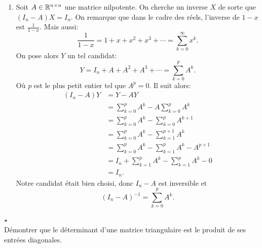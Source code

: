 {\begin{td-sol}[]
\begin{enumerate}
			\item Soit \(A\in \mathbb{R}^{n\times n}\) une matrice nilpotente. On cherche un inverse \(X\)
			de sorte que \((I_n - A)X = I_n\). On remarque que dans le cadre des réels,
			l'inverse de \(1 - x\) est \(\frac{1}{1 - x}\). Mais aussi:
			\begin{equation*}
				\frac{1}{1 - x} = 1 + x + x^2 + x^3 + \cdots = \sum_{k=0}^{\infty} x^k.
			\end{equation*}
			On pose alors \(Y\) un tel candidat:
			\begin{equation*}
				Y = I_n + A + A^2 + A^3 + \cdots = \sum_{k=0}^{p} A^k.
			\end{equation*}
			Où \(p\) est le plus petit entier tel que \(A^p = 0\). Il suit alors:
			\begin{equation*}
				\begin{aligned}
					(I_n - A)Y
					&= Y - AY\\
					&= \sum_{k=0}^{p} A^k - A \sum_{k=0}^{p} A^{k}\\
					&= \sum_{k=0}^{p} A^k - \sum_{k=0}^{p} A^{k+1}\\
					&= \sum_{k=0}^{p} A^k - \sum_{k=1}^{p+1} A^{k}\\
					&= \sum_{k=0}^{p} A^k - \sum_{k=1}^{p} A^{k} - A^{p+1}\\
					&= I_n + \sum_{k=1}^{p} A^k - \sum_{k=1}^{p} A^{k} - 0\\
					&= I_n.
				\end{aligned}
			\end{equation*}
			Notre candidat était bien choisi, donc \(I_n - A\) est inversible et
			\begin{equation*}
				\boxed{{(I_n - A)}^{-1} = \sum_{k=0}^{p} A^k}.
			\end{equation*}
		\end{enumerate}
	\end{td-sol}
}{}


\begin{td-exo} \(\star\) \,\\%
	Démontrer que le déterminant d'une matrice triangulaire est le produit de ses
	entrées diagonales.
\end{td-exo}

